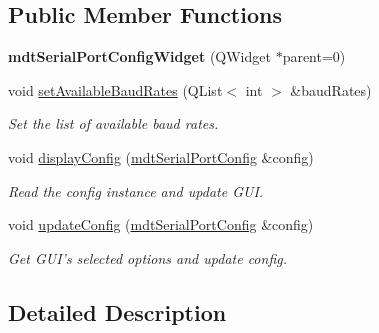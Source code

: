 \subsection*{Public Member Functions}
\begin{DoxyCompactItemize}
\item 
\hypertarget{classmdt_serial_port_config_widget_a7c6dc14693263f011e0725d45040b0f3}{
{\bfseries mdtSerialPortConfigWidget} (QWidget $\ast$parent=0)}
\label{classmdt_serial_port_config_widget_a7c6dc14693263f011e0725d45040b0f3}

\item 
\hypertarget{classmdt_serial_port_config_widget_a5113611573e0e8cc0fd030e887e17c86}{
void \hyperlink{classmdt_serial_port_config_widget_a5113611573e0e8cc0fd030e887e17c86}{setAvailableBaudRates} (QList$<$ int $>$ \&baudRates)}
\label{classmdt_serial_port_config_widget_a5113611573e0e8cc0fd030e887e17c86}

\begin{DoxyCompactList}\small\item\em Set the list of available baud rates. \end{DoxyCompactList}\item 
\hypertarget{classmdt_serial_port_config_widget_a3cc8a728e224b656510896f31047fb73}{
void \hyperlink{classmdt_serial_port_config_widget_a3cc8a728e224b656510896f31047fb73}{displayConfig} (\hyperlink{classmdt_serial_port_config}{mdtSerialPortConfig} \&config)}
\label{classmdt_serial_port_config_widget_a3cc8a728e224b656510896f31047fb73}

\begin{DoxyCompactList}\small\item\em Read the config instance and update GUI. \end{DoxyCompactList}\item 
void \hyperlink{classmdt_serial_port_config_widget_aebc1fba656f51f9910a466add7987fcf}{updateConfig} (\hyperlink{classmdt_serial_port_config}{mdtSerialPortConfig} \&config)
\begin{DoxyCompactList}\small\item\em Get GUI's selected options and update config. \end{DoxyCompactList}\end{DoxyCompactItemize}


\subsection{Detailed Description}


